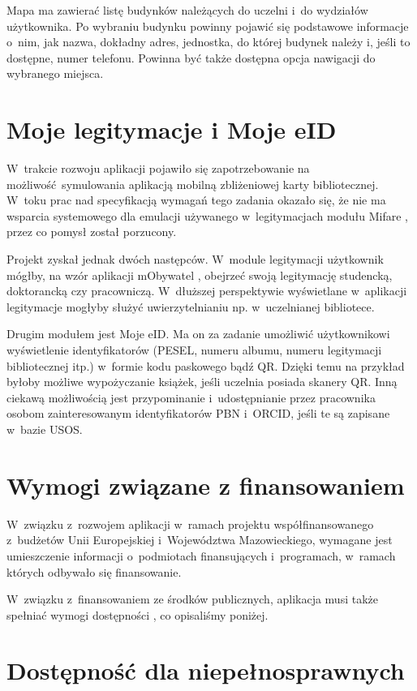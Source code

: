 \documentclass{pracamgr}
\begin{document}
Mapa ma zawierać listę budynków należących do uczelni i~do wydziałów użytkownika.
Po wybraniu budynku powinny pojawić się podstawowe informacje o~nim, jak nazwa,
dokładny adres, jednostka, do której budynek należy i, jeśli to dostępne, numer telefonu.
Powinna być także dostępna opcja nawigacji do wybranego miejsca.

\section{Moje legitymacje i Moje eID}

W~trakcie rozwoju aplikacji pojawiło się zapotrzebowanie na możliwość symulowania
aplikacją mobilną zbliżeniowej karty bibliotecznej. W~toku prac nad specyfikacją wymagań
tego zadania okazało się, że nie ma wsparcia systemowego dla emulacji używanego w~legitymacjach
modułu Mifare \cite{mifare}, przez co pomysł został porzucony.

Projekt zyskał jednak dwóch następców. W~module legitymacji użytkownik mógłby, na wzór
aplikacji mObywatel \cite{mobywatel}, obejrzeć swoją legitymację studencką, doktorancką czy
pracowniczą. W~dłuższej perspektywie wyświetlane w~aplikacji legitymacje mogłyby służyć
uwierzytelnianiu np. w~uczelnianej bibliotece.

Drugim modułem jest Moje eID. Ma on za zadanie umożliwić użytkownikowi
wyświetlenie identyfikatorów (PESEL, numeru albumu, numeru legitymacji bibliotecznej itp.)
w~formie kodu paskowego bądź QR. Dzięki temu na przykład byłoby możliwe
wypożyczanie książek, jeśli uczelnia posiada skanery QR. Inną ciekawą możliwością jest
przypominanie i~udostępnianie przez pracownika osobom zainteresowanym identyfikatorów
PBN i~ORCID, jeśli te są zapisane w~bazie USOS.

\section{Wymogi związane z finansowaniem}

W~związku z~rozwojem aplikacji w~ramach projektu współfinansowanego z~budżetów Unii
Europejskiej i~Województwa Mazowieckiego, wymagane jest umieszczenie informacji
o~podmiotach finansujących i~programach, w~ramach których odbywało się finansowanie.

W~związku z~finansowaniem ze środków publicznych, aplikacja musi także spełniać wymogi
dostępności \cite{uodc}, co opisaliśmy poniżej.

\section{Dostępność dla niepełnosprawnych}
\end{document}
